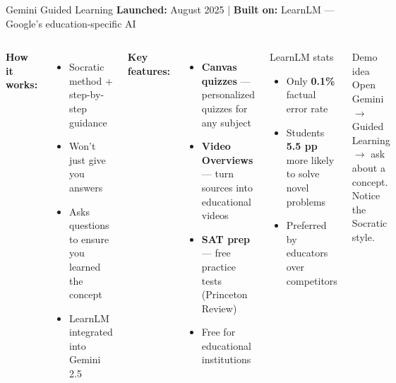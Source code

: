 \documentclass[aspectratio=169]{beamer}
\begin{document}
\begin{frame}{Gemini Guided Learning}
\small
\textbf{\color{paramgreen}Launched:} August 2025 \quad|\quad
\textbf{\color{paramgreen}Built on:} LearnLM --- Google's education-specific AI

\smallskip
\begin{columns}[T]
\textbf{How it works:}
\begin{itemize}\setlength\itemsep{0em}
  \item Socratic method + step-by-step guidance
  \item Won't just give you answers
  \item Asks questions to ensure you learned the concept
  \item LearnLM integrated into Gemini 2.5
\end{itemize}

\smallskip
\textbf{Key features:}
\begin{itemize}\setlength\itemsep{0em}
  \item \textbf{Canvas quizzes} --- personalized quizzes for any subject
  \item \textbf{Video Overviews} --- turn sources into educational videos
  \item \textbf{SAT prep} --- free practice tests (Princeton Review)
  \item Free for educational institutions
\end{itemize}

\begin{exampleblock}{LearnLM stats}
\begin{itemize}\setlength\itemsep{0em}
  \item Only \textbf{0.1\%} factual error rate
  \item Students \textbf{5.5 pp} more likely to solve novel problems
  \item Preferred by educators over competitors
\end{itemize}
\end{exampleblock}

\smallskip
\begin{alertblock}{Demo idea}
Open Gemini $\to$ Guided Learning $\to$ ask about a concept. Notice the Socratic style.
\end{alertblock}
\end{columns}
\end{frame}
\end{document}
